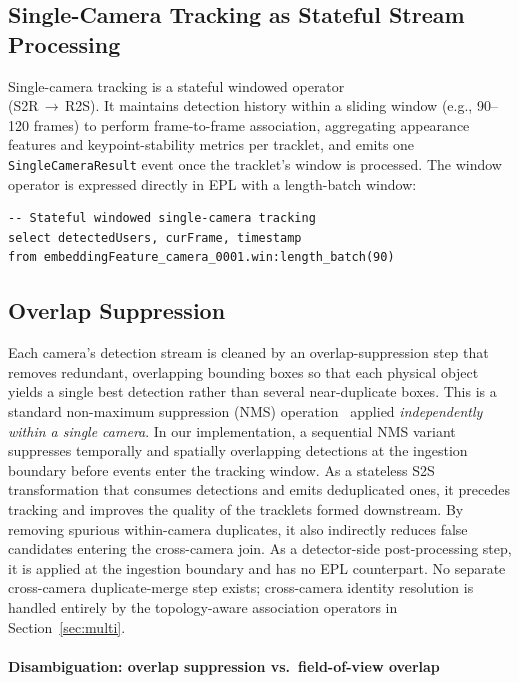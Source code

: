 \documentclass[5p,times]{elsarticle}
\begin{document}
\subsection{Single-Camera Tracking as Stateful Stream Processing}
\label{sec:single:sct}
Single-camera tracking is a stateful windowed operator\\ (S2R\,$\rightarrow$\,R2S). It maintains detection history within a sliding window (e.g., 90--120 frames) to perform frame-to-frame association, aggregating appearance features and keypoint-stability metrics per tracklet, and emits one \texttt{SingleCameraResult} event once the tracklet's window is processed. The window operator is expressed directly in EPL with a length-batch window:
{\small
\begin{verbatim}
-- Stateful windowed single-camera tracking
select detectedUsers, curFrame, timestamp
from embeddingFeature_camera_0001.win:length_batch(90)
\end{verbatim}
}
\subsection{Overlap Suppression}
\label{sec:single:overlap}

Each camera's detection stream is cleaned by an overlap-suppression step that removes redundant, overlapping bounding boxes so that each physical object yields a single best detection rather than several near-duplicate boxes. This is a standard non-maximum suppression (NMS) operation~\cite{neubeck2006efficient} %
applied \emph{independently within a single camera}. In our implementation, a sequential NMS variant suppresses temporally and spatially overlapping detections at the ingestion boundary before events enter the tracking window. As a stateless S2S transformation that consumes detections and emits deduplicated ones, it precedes tracking and improves the quality of the tracklets formed downstream. By removing spurious within-camera duplicates, it also indirectly reduces false candidates entering the cross-camera join. As a detector-side post-processing step, it is applied at the ingestion boundary and has no EPL counterpart. No separate cross-camera duplicate-merge step exists; cross-camera identity resolution is handled entirely by the topology-aware association operators in Section~\ref{sec:multi}.

\paragraph{Disambiguation: overlap suppression vs.\ field-of-view overlap}
\end{document}
